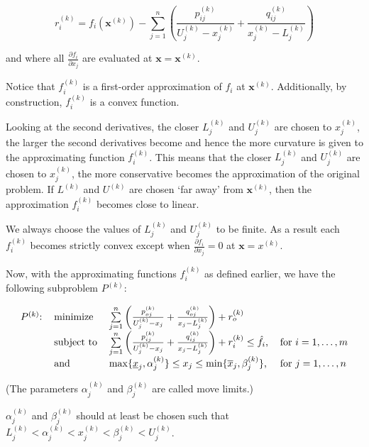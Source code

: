 $$r_i^{(k)}=f_i(\mathbf{x}^{(k)})-\sum\limits_{j=1}^{n}\left(\frac{p_{ij}^{(k)}}{U_j^{(k)}-x_j^{(k)}}+\frac{q_{ij}^{(k)}}{x_j^{(k)}-L_j^{(k)}}\right)$$
	
and where all $\frac{\partial f_i}{\partial x_j}$ are evaluated at $\mathbf{x}=\mathbf{x}^{(k)}$.

Notice that $f_i^{(k)}$ is a first-order approximation of $f_i$ at $\mathbf{x}^{(k)}$. Additionally, by construction, $f_i^{(k)}$ is a convex function.

Looking at the second derivatives, the closer $L_j^{(k)}$ and $U_j^{(k)}$ are chosen to $x_j^{(k)}$, the larger the second derivatives become and hence the more curvature is given to the approximating function $f_i^{(k)}$. This means that the closer $L_j^{(k)}$ and $U_j^{(k)}$ are chosen to $x_j^{(k)}$, the more conservative becomes the approximation of the original problem. If $L^{(k)}$ and $U^{(k)}$ are chosen `far away' from $\mathbf{x}^{(k)}$, then the approximation $f_i^{(k)}$ becomes close to linear.

We always choose the values of $L_j^{(k)}$ and $U_j^{(k)}$ to be finite. As a result each $f_i^{(k)}$ becomes strictly convex except when $\frac{\partial f_i}{\partial x_j}=0$ at $\mathbf{x}=x^{(k)}$.

Now, with the approximating functions $f_i^{(k)}$ as defined earlier, we have the following subproblem $P^{(k)}$:

\begin{equation}
	\begin{tabular}{llll}
		$P^{(k)}$: & minimize   & $\sum\limits_{j=1}^{n}\left(\frac{p_{oj}^{(k)}}{U_j^{(k)}-x_j}+\frac{q_{oj}^{(k)}}{x_j-L_j^{(k)}}\right)+r_o^{(k)}$               &                    \\
		           & subject to & $\sum\limits_{j=1}^{n}\left(\frac{p_{ij}^{(k)}}{U_j^{(k)}-x_j}+\frac{q_{ij}^{(k)}}{x_j-L_j^{(k)}}\right)+r_i^{(k)}\leq\hat{f}_i$, & for $i=1,\ldots,m$ \\
		           & and        & $\max\lbrace\underline{x}_j,\alpha_j^{(k)}\rbrace\leq x_j\leq \min\lbrace \overline{x}_j,\beta_j^{(k)}\rbrace$,                   & for $j=1,\ldots,n$ 
	\end{tabular}
\end{equation}

(The parameters $\alpha_j^{(k)}$ and $\beta_j^{(k)}$ are called move limits.)

$\alpha_j^{(k)}$ and $\beta_j^{(k)}$ should at least be chosen such that $L_j^{(k)}<\alpha_j^{(k)}<x_j^{(k)}<\beta_j^{(k)}<U_j^{(k)}$.


